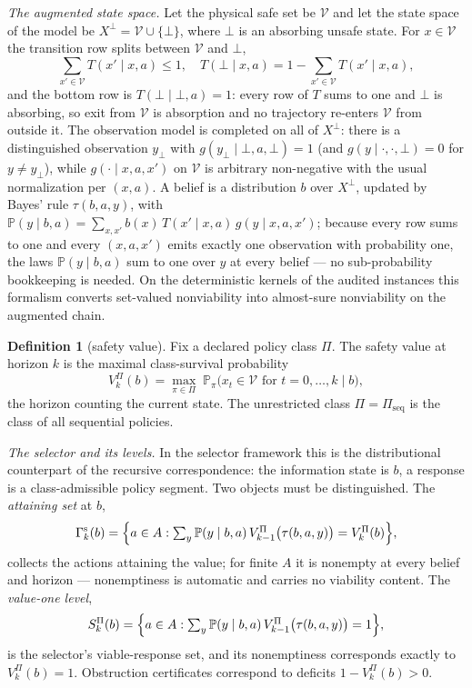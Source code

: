 \documentclass[10pt,twocolumn]{article}
\theoremstyle{plain}
\theoremstyle{definition}
\newtheorem{definition}[theorem]{Definition}
\theoremstyle{remark}
\begin{document}
\emph{The augmented state space.} Let the physical safe set be
\(\mathcal{V}\) and let the state space of the model be
\(X^{\perp} = \mathcal{V} \cup \{\bot\}\), where \(\bot\) is an absorbing
unsafe state. For \(x \in \mathcal{V}\) the transition row splits between
\(\mathcal{V}\) and \(\bot\),
\[
\textstyle\sum_{x' \in \mathcal{V}} T(x' \mid x, a) \le 1,\quad
T(\bot \mid x, a) = 1 - \sum_{x' \in \mathcal{V}} T(x' \mid x, a),
\]
and the bottom row is \(T(\bot \mid \bot, a) = 1\): every row of \(T\)
sums to one and \(\bot\) is absorbing, so exit from \(\mathcal{V}\) is
absorption and no trajectory re-enters \(\mathcal{V}\) from outside it.
The observation model is completed on all of \(X^{\perp}\): there is a
distinguished observation \(y_{\bot}\) with
\(g(y_{\bot} \mid \bot, a, \bot) = 1\) (and
\(g(y \mid \cdot, \cdot, \bot) = 0\) for \(y \ne y_{\bot}\)), while
\(g(\cdot \mid x, a, x')\) on \(\mathcal{V}\) is arbitrary non-negative
with the usual normalization per \((x, a)\). A belief is a distribution
\(b\) over \(X^{\perp}\), updated by Bayes' rule \(\tau(b, a, y)\), with
\(\mathbb{P}(y \mid b, a) = \sum_{x, x'} b(x)\, T(x' \mid x, a)\,
g(y \mid x, a, x')\); because every row sums to one and every
\((x, a, x')\) emits exactly one observation with probability one, the
laws \(\mathbb{P}(y \mid b, a)\) sum to one over \(y\) at every belief ---
no sub-probability bookkeeping is needed. On the deterministic kernels of
the audited instances this formalism converts set-valued nonviability into
almost-sure nonviability on the augmented chain.

\begin{definition}[safety value]\label{def:value}
Fix a declared policy class \(\Pi\). The safety value at horizon \(k\) is
the maximal class-survival probability
\[
V^{\Pi}_{k}(b) = \max_{\pi \in \Pi}\; \mathbb{P}_{\pi}\bigl( x_{t} \in
\mathcal{V} \text{ for } t = 0, \dots, k \;\big|\; b \bigr),
\]
the horizon counting the current state. The unrestricted class
\(\Pi = \Pi_{\mathrm{seq}}\) is the class of all sequential policies.
\end{definition}

\emph{The selector and its levels.} In the selector framework this is the
distributional counterpart of the recursive correspondence: the
information state is \(b\), a response is a class-admissible policy
segment. Two objects must be distinguished. The \emph{attaining set} at
\(b\),
\[
\Gamma^{\mathrm{s}}_{k}(b) = \Bigl\{ a \in A : \textstyle\sum_{y}
\mathbb{P}(y \mid b, a)\, V^{\Pi}_{k-1}\bigl(\tau(b, a, y)\bigr)
= V^{\Pi}_{k}(b) \Bigr\},
\]
collects the actions attaining the value; for finite \(A\) it is nonempty
at every belief and horizon --- nonemptiness is automatic and carries no
viability content. The \emph{value-one level},
\[
S^{\Pi}_{k}(b) = \Bigl\{ a \in A : \textstyle\sum_{y} \mathbb{P}(y \mid
b, a)\, V^{\Pi}_{k-1}\bigl(\tau(b, a, y)\bigr) = 1 \Bigr\},
\]
is the selector's viable-response set, and its nonemptiness corresponds
exactly to \(V^{\Pi}_{k}(b) = 1\). Obstruction certificates correspond to
deficits \(1 - V^{\Pi}_{k}(b) > 0\).
\end{document}
